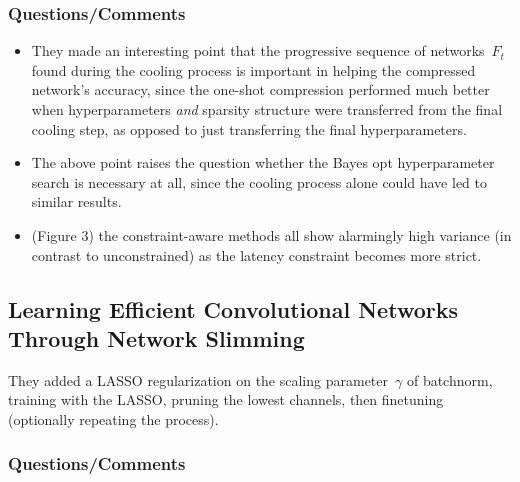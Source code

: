 \documentclass[a4paper, 12pt]{article}
\begin{document}
\subsubsection{Questions/Comments}

\begin{itemize}
        \item They made an interesting point that the progressive sequence of
                networks~$F_t$ found during the cooling process is important in
                helping the compressed network's accuracy, since the one-shot
                compression performed much better when hyperparameters
                \emph{and} sparsity structure were transferred from the final
                cooling step, as opposed to just transferring the final
                hyperparameters.

        \item The above point raises the question whether the Bayes opt
                hyperparameter search is necessary at all, since the cooling
                process alone could have led to similar results.

        \item (Figure 3) the constraint-aware methods all show alarmingly high
                variance (in contrast to unconstrained) as the latency
                constraint becomes more strict.
\end{itemize}


\subsection{Learning Efficient Convolutional Networks Through Network
            Slimming~\cite{liu2017learning}}

They added a LASSO regularization on the scaling parameter~$\gamma$ of
batchnorm, training with the LASSO, pruning the lowest channels, then
finetuning (optionally repeating the process).


\subsubsection{Questions/Comments}
\end{document}

